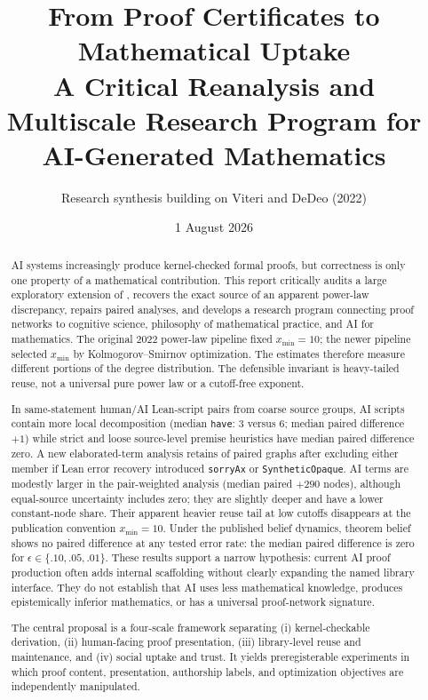 \documentclass[11pt]{article}
\title{\textbf{From Proof Certificates to Mathematical Uptake}\\
\large A Critical Reanalysis and Multiscale Research Program for AI-Generated Mathematics}
\author{Research synthesis building on Viteri and DeDeo (2022)}
\date{1 August 2026}
\newcommand{\code}[1]{\texttt{#1}}
\newcommand{\xmin}{x_{\min}}
\begin{document}
\maketitle

\begin{abstract}
AI systems increasingly produce kernel-checked formal proofs, but correctness is only one
property of a mathematical contribution.  This report critically audits a large exploratory
extension of \citet{viteri2022}, recovers the exact source of an apparent power-law
discrepancy, repairs paired analyses, and develops a research program connecting proof
networks to cognitive science, philosophy of mathematical practice, and AI for mathematics.
The original 2022 power-law pipeline fixed $\xmin=10$; the newer pipeline selected $\xmin$
by Kolmogorov--Smirnov optimization.  The estimates therefore measure different portions of
the degree distribution.  The defensible invariant is heavy-tailed reuse, not a universal
pure power law or a cutoff-free exponent.

In \SourceN{} same-statement human/AI Lean-script pairs from \SourceClusters{} coarse source
groups, AI scripts contain more local decomposition (median \code{have}: 3 versus 6;
median paired difference $+1$) while strict and loose source-level premise heuristics have
median paired difference zero.  A new elaborated-term analysis retains \TermN{} of
\TermEligible{} paired graphs after excluding either member if Lean error recovery introduced
\code{sorryAx} or \code{SyntheticOpaque}.  AI terms are modestly larger in the pair-weighted
analysis (median paired $+290$ nodes), although equal-source uncertainty includes zero; they are
slightly deeper and have a lower constant-node share.  Their apparent heavier
reuse tail at low cutoffs disappears at the publication convention $\xmin=10$.
Under the published belief dynamics, theorem belief shows no paired difference at any tested
error rate: the median paired difference is zero for $\epsilon\in\{.10,.05,.01\}$.
These results support a narrow hypothesis: current AI proof production often adds internal
scaffolding without clearly expanding the named library interface.  They do not establish
that AI uses less mathematical knowledge, produces epistemically inferior mathematics, or
has a universal proof-network signature.

The central proposal is a four-scale framework separating (i) kernel-checkable derivation,
(ii) human-facing proof presentation, (iii) library-level reuse and maintenance, and
(iv) social uptake and trust.  It yields preregisterable experiments in which proof content,
presentation, authorship labels, and optimization objectives are independently manipulated.
\end{abstract}
\end{document}

